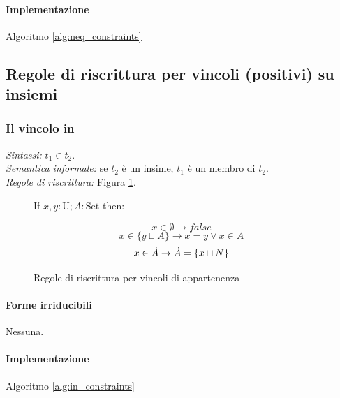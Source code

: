 \documentclass[12pt,a4paper,openright]{book} %
\begin{document}
\paragraph{Implementazione}
Algoritmo \ref{alg:neq_constraints}

\subsection{Regole di riscrittura per vincoli (positivi) su insiemi}
\label{subsec:clpbasedlang_lset_rewriteset}

\subsubsection{Il vincolo in}

\textit{Sintassi:} $t_1 \in t_2$.\\
\noindent\textit{Semantica informale:} se $t_2$ è un insime, $t_1$ è un membro di $t_2$.\\
\noindent\textit{Regole di riscrittura:} Figura \ref{fig:in_constraints}.

\begin{figure}
	\begin{tcolorbox}[colframe=black, colback=white, sharp corners]
		\setcounter{equation}{0}
		\renewcommand{\theequation}{$\in$\textsubscript{\arabic{equation}}}
		
		If $x, y: \text{U}; A: \text{Set}$ then:
		
		\begin{equation}
		x \in \emptyset \to false
		\end{equation}
		\begin{equation}
		x \in \{ y \sqcup A \} \to x = y \lor x \in A
		\end{equation}
		\begin{equation}
		x \in \dot{A} \to \dot{A} = \{ x \sqcup N \}
		\end{equation}
		
	\end{tcolorbox}
	
	\caption{Regole di riscrittura per vincoli di appartenenza}
	\label{fig:in_constraints}
\end{figure}

\paragraph{Forme irriducibili} Nessuna.

\paragraph{Implementazione}
Algoritmo \ref{alg:in_constraints}
\end{document}
